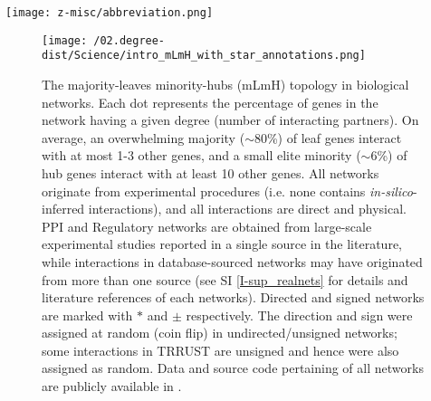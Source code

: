 {\centering\texttt{[image: z-misc/abbreviation.png]}}
\vspace{.1cm}
\begin{figure}[H]%
        \texttt{[image: /02.degree-dist/Science/intro\_mLmH\_with\_star\_annotations.png]}
        \caption{The majority-leaves minority-hubs (mLmH) topology in biological networks. Each dot represents the percentage of genes in the network having a given degree (number of interacting partners).  On average, an overwhelming majority (${\sim}$80\%) of leaf genes interact with at most 1-3 other genes, and a small elite minority (${\sim}$6\%) of hub genes interact with at least 10 other genes. All networks originate from experimental procedures (i.e. none contains \textit{in-silico}-inferred interactions), and all interactions are direct and physical. PPI and Regulatory networks are obtained from large-scale experimental studies reported in a single source in the literature, while interactions in database-sourced networks may have originated from more than one source (see SI \ref{I-sup_realnets} for details and literature references of each networks). Directed and signed networks are marked with $*$ and $\pm$ respectively. The direction and sign were assigned at random (coin flip) in undirected/unsigned networks; some interactions in TRRUST are unsigned and hence were also assigned as random. Data and source code pertaining of all networks are publicly available in  \cite{atiia_case-study_2017}.
        }
        \label{mLmH_fig}
\end{figure}


